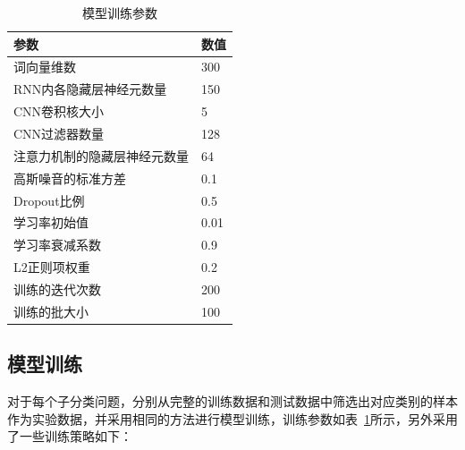 \begin{table}[htb]
  \centering
  \begin{minipage}[t]{0.55\linewidth}
  \caption{模型训练参数}
  \label{tab:exp_irony_det_model_param}
    \begin{tabularx}{\linewidth}{X|l}
    \toprule[1.5pt]
    参数 & 数值 \\
    \hline
    词向量维数 & 300 \\
    RNN内各隐藏层神经元数量 & 150 \\
    CNN卷积核大小 & 5 \\
    CNN过滤器数量 & 128 \\
    注意力机制的隐藏层神经元数量 & 64 \\
    高斯噪音的标准方差 & 0.1 \\
    Dropout比例 & 0.5 \\
    学习率初始值 & 0.01 \\
    学习率衰减系数 & 0.9 \\
    L2正则项权重 & 0.2 \\
    训练的迭代次数 & 200 \\
    训练的批大小 & 100 \\
    \bottomrule[1.5pt]
    \end{tabularx}
  \end{minipage}
\end{table}

\subsection{模型训练}
\label{ssec:exp_irony_det_model_training}

对于每个子分类问题，分别从完整的训练数据和测试数据中筛选出对应类别的样本作为实验数据，并采用相同的方法进行模型训练，训练参数如表~\ref{tab:exp_irony_det_model_param}所示，另外采用了一些训练策略如下：

